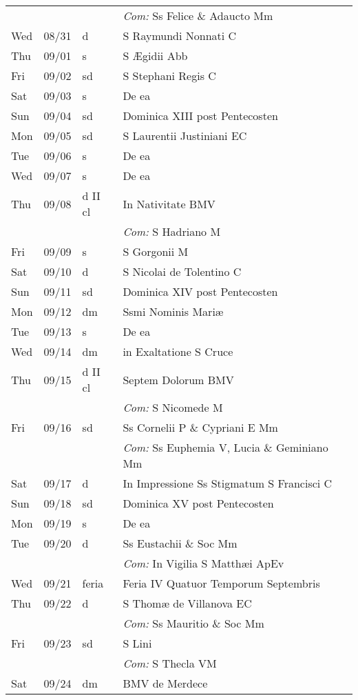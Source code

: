 \documentclass[10pt]{article}
\begin{document}
\begin{longtable}{ l l l l }
 & & & \textit{Com:} Ss Felice \& Adaucto Mm\\
Wed & 08/31 & d & S Raymundi Nonnati C\\
Thu & 09/01 & s & S Ægidii Abb\\
Fri & 09/02 & sd & S Stephani Regis C\\
Sat & 09/03 & s & De ea\\
Sun & 09/04 & sd & Dominica XIII post Pentecosten\\
Mon & 09/05 & sd & S Laurentii Justiniani EC\\
Tue & 09/06 & s & De ea\\
Wed & 09/07 & s & De ea\\
Thu & 09/08 & d II cl & In Nativitate BMV\\
 & & & \textit{Com:} S Hadriano M\\
Fri & 09/09 & s & S Gorgonii M\\
Sat & 09/10 & d & S Nicolai de Tolentino C\\
Sun & 09/11 & sd & Dominica XIV post Pentecosten\\
Mon & 09/12 & dm & Ssmi Nominis Mariæ\\
Tue & 09/13 & s & De ea\\
Wed & 09/14 & dm & in Exaltatione S Cruce\\
Thu & 09/15 & d II cl & Septem Dolorum BMV\\
 & & & \textit{Com:} S Nicomede M\\
Fri & 09/16 & sd & Ss Cornelii P \& Cypriani E Mm\\
 & & & \textit{Com:} Ss Euphemia V, Lucia \& Geminiano Mm\\
Sat & 09/17 & d & In Impressione Ss Stigmatum S Francisci C\\
Sun & 09/18 & sd & Dominica XV post Pentecosten\\
Mon & 09/19 & s & De ea\\
Tue & 09/20 & d & Ss Eustachii \& Soc Mm\\
 & & & \textit{Com:} In Vigilia S Matthæi ApEv\\
Wed & 09/21 & feria & Feria IV Quatuor Temporum Septembris\\
Thu & 09/22 & d & S Thomæ de Villanova EC\\
 & & & \textit{Com:} Ss Mauritio \& Soc Mm\\
Fri & 09/23 & sd & S Lini\\
 & & & \textit{Com:} S Thecla VM\\
Sat & 09/24 & dm & BMV de Merdece\\

\end{longtable}
\end{document}
